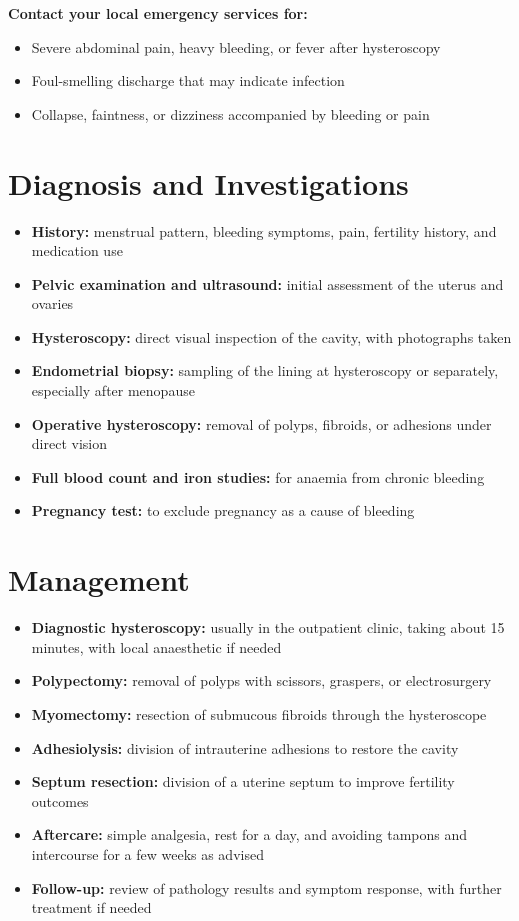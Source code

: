 \textbf{Contact your local emergency services for:}
\begin{itemize}
    \item Severe abdominal pain, heavy bleeding, or fever after hysteroscopy
    \item Foul-smelling discharge that may indicate infection
    \item Collapse, faintness, or dizziness accompanied by bleeding or pain
\end{itemize}

\section*{Diagnosis and Investigations}
\begin{itemize}
    \item \textbf{History:} menstrual pattern, bleeding symptoms, pain, fertility history, and medication use
    \item \textbf{Pelvic examination and ultrasound:} initial assessment of the uterus and ovaries
    \item \textbf{Hysteroscopy:} direct visual inspection of the cavity, with photographs taken
    \item \textbf{Endometrial biopsy:} sampling of the lining at hysteroscopy or separately, especially after menopause
    \item \textbf{Operative hysteroscopy:} removal of polyps, fibroids, or adhesions under direct vision
    \item \textbf{Full blood count and iron studies:} for anaemia from chronic bleeding
    \item \textbf{Pregnancy test:} to exclude pregnancy as a cause of bleeding
\end{itemize}

\section*{Management}
\begin{itemize}
    \item \textbf{Diagnostic hysteroscopy:} usually in the outpatient clinic, taking about 15 minutes, with local anaesthetic if needed
    \item \textbf{Polypectomy:} removal of polyps with scissors, graspers, or electrosurgery
    \item \textbf{Myomectomy:} resection of submucous fibroids through the hysteroscope
    \item \textbf{Adhesiolysis:} division of intrauterine adhesions to restore the cavity
    \item \textbf{Septum resection:} division of a uterine septum to improve fertility outcomes
    \item \textbf{Aftercare:} simple analgesia, rest for a day, and avoiding tampons and intercourse for a few weeks as advised
    \item \textbf{Follow-up:} review of pathology results and symptom response, with further treatment if needed
\end{itemize}

